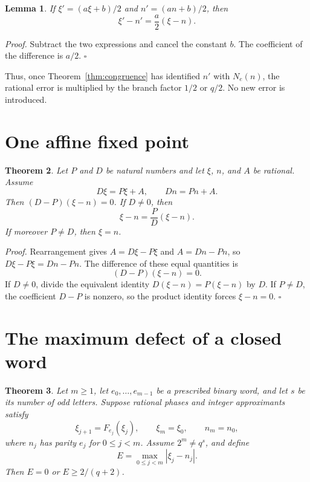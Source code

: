 \documentclass[11pt,letterpaper]{article}
\newtheorem{theorem}{Theorem}
\newtheorem{lemma}[theorem]{Lemma}
\newenvironment{proof}{\noindent\textit{Proof.}}{\hfill\(\square\)}
\begin{document}
\begin{lemma}
\label{lem:transport}
If \(\xi'=(a\xi+b)/2\) and \(n'=(an+b)/2\), then
\[
\xi'-n'=\frac{a}{2}(\xi-n).
\]
\end{lemma}

\begin{proof}
Subtract the two expressions and cancel the constant \(b\). The coefficient of the difference is \(a/2\).
\end{proof}

Thus, once Theorem~\ref{thm:congruence} has identified \(n'\) with \(N_e(n)\), the rational error is multiplied by the branch factor \(1/2\) or \(q/2\). No new error is introduced.

\section{One affine fixed point}

\begin{theorem}
\label{thm:unique}
Let \(P\) and \(D\) be natural numbers and let \(\xi\), \(n\), and \(A\) be rational. Assume
\[
D\xi=P\xi+A,\qquad Dn=Pn+A.
\]
Then \((D-P)(\xi-n)=0\). If \(D\neq 0\), then
\[
\xi-n=\frac{P}{D}(\xi-n).
\]
If moreover \(P\neq D\), then \(\xi=n\).
\end{theorem}

\begin{proof}
Rearrangement gives \(A=D\xi-P\xi\) and \(A=Dn-Pn\), so \(D\xi-P\xi=Dn-Pn\). The difference of these equal quantities is
\[
(D-P)(\xi-n)=0.
\]
If \(D\neq 0\), divide the equivalent identity \(D(\xi-n)=P(\xi-n)\) by \(D\). If \(P\neq D\), the coefficient \(D-P\) is nonzero, so the product identity forces \(\xi-n=0\).
\end{proof}

\section{The maximum defect of a closed word}

\begin{theorem}
\label{thm:cycle}
Let \(m\ge1\), let \(e_0,\ldots,e_{m-1}\) be a prescribed binary word,
and let \(s\) be its number of odd letters. Suppose rational phases and
integer approximants satisfy
\[
\xi_{j+1}=F_{e_j}(\xi_j),\qquad
\xi_m=\xi_0,\qquad n_m=n_0,
\]
where \(n_j\) has parity \(e_j\) for \(0\le j<m\).
Assume \(2^m\ne q^s\), and define
\[
E=\max_{0\le j<m}|\xi_j-n_j|.
\]
Then \(E=0\) or \(E\ge 2/(q+2)\).
\end{theorem}
\end{document}
